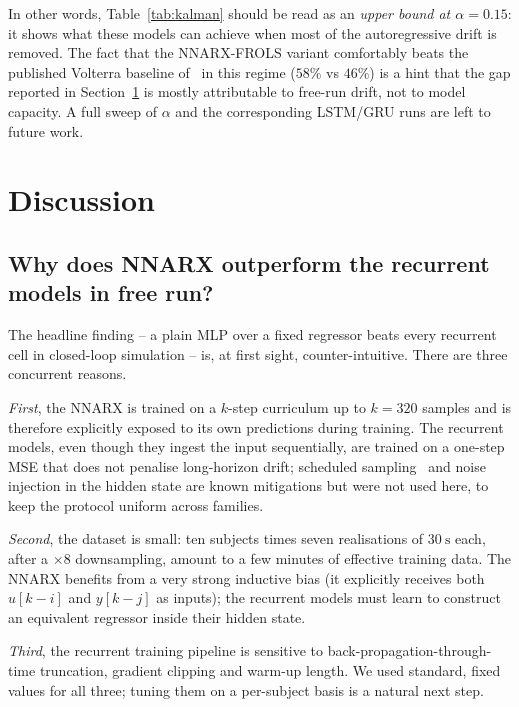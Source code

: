 \documentclass[conference]{IEEEtran}
\begin{document}
In other words, Table~\ref{tab:kalman} should be read as an
\emph{upper bound at $\alpha=0.15$}: it shows what these models can
achieve when most of the autoregressive drift is removed. The fact
that the NNARX-FROLS variant comfortably beats the published Volterra
baseline of~\cite{Vlaar2018} in this regime ($58\%$ vs $46\%$) is a
hint that the gap reported in Section~\ref{sec:discussion} is mostly
attributable to free-run drift, not to model capacity. A full sweep of
$\alpha$ and the corresponding LSTM/GRU runs are left to future work.

\section{Discussion}\label{sec:discussion}

\subsection{Why does NNARX outperform the recurrent models in free run?}

The headline finding -- a plain MLP over a fixed regressor beats every
recurrent cell in closed-loop simulation -- is, at first sight,
counter-intuitive. There are three concurrent reasons.

\emph{First}, the NNARX is trained on a $k$-step curriculum up to
$k=320$ samples and is therefore explicitly exposed to its own
predictions during training. The recurrent models, even though they
ingest the input sequentially, are trained on a one-step MSE that does
not penalise long-horizon drift; scheduled
sampling~\cite{Bengio2015} and noise injection in the hidden state are
known mitigations but were not used here, to keep the protocol
uniform across families.

\emph{Second}, the dataset is small: ten subjects times seven
realisations of $30~\mathrm{s}$ each, after a $\times 8$ downsampling,
amount to a few minutes of effective training data. The NNARX
benefits from a very strong inductive bias (it explicitly receives
both $u[k\!-\!i]$ and $y[k\!-\!j]$ as inputs); the recurrent models
must learn to construct an equivalent regressor inside their hidden
state.

\emph{Third}, the recurrent training pipeline is sensitive to
back-propagation-through-time truncation, gradient clipping and warm-up
length. We used standard, fixed values for all three; tuning them on a
per-subject basis is a natural next step.
\end{document}
